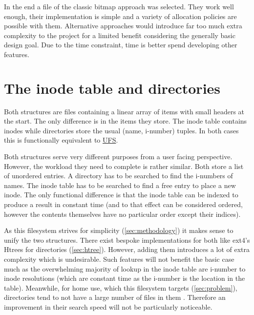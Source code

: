         In the end a file of the classic bitmap approach was selected. They
        work well enough, their implementation is simple and a variety of
        allocation policies are possible with them. Alternative approaches
        would introduce far too much extra complexity to the project for a
        limited benefit considering the generally basic design goal. Due to the time
        constraint, time is better spend developing other features.

    \section{The inode table and directories}

        Both structures are files containing a linear array of items with small
        headers at the start. The only difference is in the items they store.
        The inode table contains inodes while directories store the usual
        (name, i-number) tuples. In both cases this is functionally equivalent
        to \hyperref[sec:UFS]{UFS}.

        Both structures serve very different purposes from a user facing
        perspective. However, the workload they need to complete is rather
        similar. Both store a list of unordered entries. A directory has to be
        searched to find the i-numbers of names. The inode table has to be
        searched to find a free entry to place a new inode. The only functional
        difference is that the inode table can be indexed to produce a result
        in constant time (and to that effect can be considered ordered, however
        the contents themselves have no particular order except their indices).

        As this filesystem strives for simplicity (\autoref{sec:methodology}) it
        makes sense to unify the two structures. There exist bespoke
        implementations for both like ext4's Htrees for directories
        (\autoref{sec:htree}). However, adding them introduces a lot of extra
        complexity which is undesirable. Such features will not benefit the
        basic case much as the overwhelming majority of lookup in the inode
        table are i-number to inode resolutions (which are constant time as the
        i-number is the location in the table). Meanwhile, for home use, which this
        filesystem targets (\autoref{sec:problem}), directories tend to not have a
        large number of files in them \cite{contents_study}. Therefore an
        improvement in their search speed will not be particularly noticeable.

